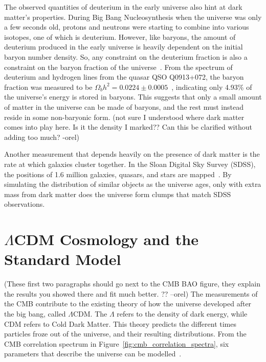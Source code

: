 The observed quantities of deuterium in the early universe also hint at dark matter's properties.
During Big Bang Nucleosynthesis when the universe was only a few seconds old, protons and neutrons were starting to combine into various isotopes, one of which is deuterium.
However, like baryons, the amount of deuterium produced in the early universe is heavily dependent on the initial baryon number density.
So, any constraint on the deuterium fraction is also a constraint on the baryon fraction of the universe~\cite{deuterium1,deuterium2}.
From the spectrum of deuterium and hydrogen lines from the quasar QSO Q0913+072, the baryon fraction was measured to be $\Omega_{b}h^2 = 0.0224 \pm 0.0005$~\cite{deuterium3}, indicating only 4.93\% of the universe's energy is stored in baryons.
This suggests that only a small amount of matter in the universe can be made of baryons, and the rest must instead reside in some non-baryonic form.
{\color{red}(not sure I understood where dark matter comes into play here.  Is it the density I marked?? Can this be clarified without adding too much? -orel)}

Another measurement that depends heavily on the presence of dark matter is the rate at which galaxies cluster together.
In the Sloan Digital Sky Survey (SDSS), the positions of 1.6 million galaxies, quasars, and stars are mapped~\cite{sdss_release}.
By simulating the distribution of similar objects as the universe ages, only with extra mass from dark matter does the universe form clumps that match SDSS observations.



\section{$\Lambda$CDM Cosmology and the Standard Model}

{\color{red}(These first two paragraphs should go next to the CMB BAO figure, they explain the results you showed there and fit much better. ?? --orel)}
The measurements of the CMB contribute to the existing theory of how the universe developed after the big bang, called $\Lambda$CDM.
The $\Lambda$ refers to the density of dark energy, while CDM refers to Cold Dark Matter.
This theory predicts the different times particles froze out of the universe, and their resulting distributions.
From the CMB correlation spectrum in Figure~\ref{fig:cmb_correlation_spectra}, six parameters that describe the universe can be modelled~\cite{planck_dm_limit,planck_2013_parameters}.

